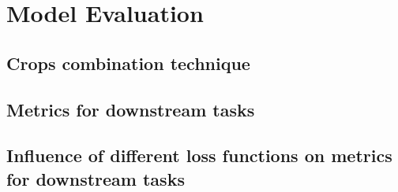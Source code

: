 \section{Model Evaluation}
    \subsection{Crops combination technique}
        
    \subsection{Metrics for downstream tasks}
        
    \subsection{Influence of different loss functions on metrics for downstream tasks}

